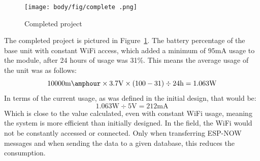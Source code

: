 \begin{figure}[!htb]
	\centering
	\texttt{[image: body/fig/complete .png]}
	\caption{Completed project}
	\label{fig:compl}
\end{figure}
\noindent
The completed project is pictured in Figure~\ref{fig:compl}.
The battery percentage of the base unit with constant WiFi access, which added a minimum of $95 \si{\milli\ampere}$ usage to the module, after 24 hours of usage was 31\%. This means the average usage of the unit was as follows:
\begin{displaymath}
    10000\si{\milli\amphour} \times 3.7\si{\volt} \times (100-31) \div 24\si{\hour} = 1.063\si{\watt}
\end{displaymath}
In terms of the current usage, as was defined in the initial design, that would be:
\begin{displaymath}
    1.063\si{\watt} \div 5\si{\volt} = 212\si{\milli\ampere}
\end{displaymath}
\noindent
Which is close to the value calculated, even with constant WiFi usage, meaning the system is more efficient than initially designed.
In the field, the WiFi would not be constantly accessed or connected. Only when transferring ESP-NOW messages and when sending the data to a given database, this reduces the consumption.

%	
